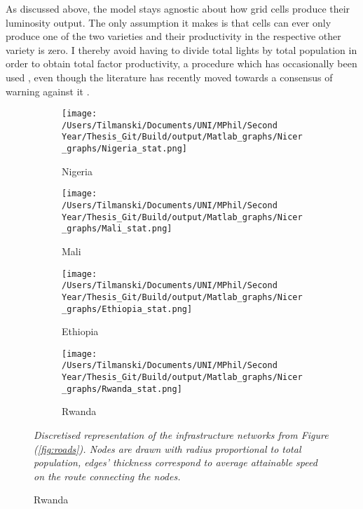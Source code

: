 \documentclass[11pt, oneside]{article}   	%
\let\oldref\ref
\renewcommand{\ref}[1]{(\oldref{#1})}
\newcommand{\mysubcaption}[1]{
\justify
\begin{spacing}{0.7}
\textit{\footnotesize #1}
\end{spacing}}
\begin{document}
As discussed above, the model stays agnostic about how grid cells produce their luminosity output. The only assumption it makes is that cells can ever only produce one of the two varieties and their productivity in the respective other variety is zero. I thereby avoid having to divide total lights by total population in order to obtain total factor productivity, a procedure which has occasionally been used \citep[see e.g.][]{DeLuca_Ethnicfavoritismaxiom_2018}, even though the literature has recently moved towards a consensus of warning against it \citep{michalopoulos_spatial_2018}.

\begin{figure}[t]
\centering
\caption{Discretised Networks for different countries}

\begin{subfigure}[c]{0.45\textwidth}
\texttt{[image: /Users/Tilmanski/Documents/UNI/MPhil/Second Year/Thesis\_Git/Build/output/Matlab\_graphs/Nicer\_graphs/Nigeria\_stat.png]}
\caption{Nigeria}
\label{fig:nigeria_mat}
\end{subfigure}
\begin{subfigure}[c]{0.45\textwidth}
\texttt{[image: /Users/Tilmanski/Documents/UNI/MPhil/Second Year/Thesis\_Git/Build/output/Matlab\_graphs/Nicer\_graphs/Mali\_stat.png]}
\caption{Mali}
\label{fig:Mali_mat}
\end{subfigure}

\begin{subfigure}[c]{0.45\textwidth}
\texttt{[image: /Users/Tilmanski/Documents/UNI/MPhil/Second Year/Thesis\_Git/Build/output/Matlab\_graphs/Nicer\_graphs/Ethiopia\_stat.png]}
\caption{Ethiopia}
\label{fig:Ethiopia_mat}
\end{subfigure}
\begin{subfigure}[c]{0.45\textwidth}
\texttt{[image: /Users/Tilmanski/Documents/UNI/MPhil/Second Year/Thesis\_Git/Build/output/Matlab\_graphs/Nicer\_graphs/Rwanda\_stat.png]}
\caption{Rwanda}
\label{fig:Rwanda_mat}
\end{subfigure}
\mysubcaption{Discretised representation of the infrastructure networks from Figure \ref{fig:roads}. Nodes are drawn with radius proportional to total population, edges' thickness correspond to average attainable speed on the route connecting the nodes.}
\label{fig:matlab_networks}
\end{figure}
\end{document}
